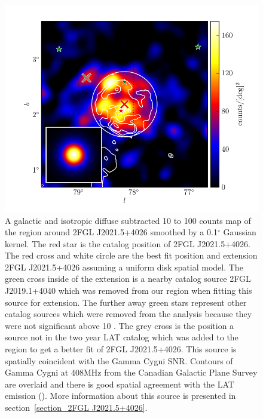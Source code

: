 \documentclass[12pt,preprint]{aastex}
\newcommand{\gev}{\text{GeV}\xspace}
\renewcommand{\deg}{\ensuremath{^\circ}\xspace}
\begin{document}
\begin{figure}
  \begin{center}
    \includegraphics[type=pdf,ext=.pdf,read=.pdf]{source_plots/source_Gamma_Cygni}
  \end{center}
  \caption{A galactic and isotropic diffuse subtracted 10 \gev to 100
  \gev counts map of the region around 2FGL J2021.5+4026 smoothed by
  a 0.1\deg Gaussian kernel. The red star is the catalog position of
  2FGL J2021.5+4026.  The red cross and white circle are the best fit
  position and extension 2FGL J2021.5+4026 assuming a uniform disk
  spatial model.  The green cross inside of the extension is a nearby
  catalog source 2FGL J2019.1+4040 which was removed from our region
  when fitting this source for extension.  The further away green stars
  represent other catalog sources which were removed from the analysis
  because they were not significant above 10 \gev.  The grey cross is
  the position a source not in the two year LAT catalog which was added
  to the region to get a better fit of 2FGL J2021.5+4026.  This source
  is spatially coincident with the Gamma Cygni SNR.  Contours of
  Gamma Cygni at 408MHz from the Canadian Galactic Plane Survey are
  overlaid and there is good spatial agreement with the LAT emission
  (\cite{canadian_galactic_plane_survey}).  More information about this
  source is presented in section~\ref{section_2FGL J2021.5+4026}.
  }\label{1FGL_J2020.0+4049}
\end{figure}
\end{document}
